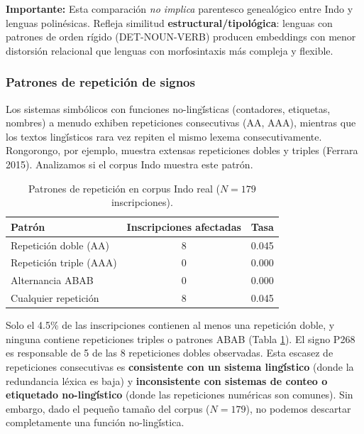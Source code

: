 \textbf{Importante:} Esta comparaci\'on \emph{no implica} parentesco geneal\'ogico entre Indo y lenguas polin\'esicas. Refleja similitud \textbf{estructural/tipol\'ogica}: lenguas con patrones de orden r\'igido (DET-NOUN-VERB) producen embeddings con menor distorsi\'on relacional que lenguas con morfosintaxis m\'as compleja y flexible.

\subsubsection{Patrones de repetici\'on de signos}

Los sistemas simb\'olicos con funciones no-ling\u\'isticas (contadores, etiquetas, nombres) a menudo exhiben repeticiones consecutivas (AA, AAA), mientras que los textos ling\u\'isticos rara vez repiten el mismo lexema consecutivamente. Rongorongo, por ejemplo, muestra extensas repeticiones dobles y triples (Ferrara 2015). Analizamos si el corpus Indo muestra este patr\'on.

\begin{table}[h]
\centering
\caption{Patrones de repetici\'on en corpus Indo real ($N=179$ inscripciones).}
\label{tab:repetition}
\begin{tabular}{lcc}
\toprule
Patr\'on & Inscripciones afectadas & Tasa \\
\midrule
Repetici\'on doble (AA) & 8 & 0.045 \\
Repetici\'on triple (AAA) & 0 & 0.000 \\
Alternancia ABAB & 0 & 0.000 \\
Cualquier repetici\'on & 8 & 0.045 \\
\bottomrule
\end{tabular}
\end{table}

Solo el 4.5\% de las inscripciones contienen al menos una repetici\'on doble, y ninguna contiene repeticiones triples o patrones ABAB (Tabla \ref{tab:repetition}). El signo P268 es responsable de 5 de las 8 repeticiones dobles observadas. Esta escasez de repeticiones consecutivas es \textbf{consistente con un sistema ling\u\'istico} (donde la redundancia l\'exica es baja) y \textbf{inconsistente con sistemas de conteo o etiquetado no-ling\u\'istico} (donde las repeticiones num\'ericas son comunes). Sin embargo, dado el peque\~no tama\~no del corpus ($N=179$), no podemos descartar completamente una funci\'on no-ling\u\'istica.

